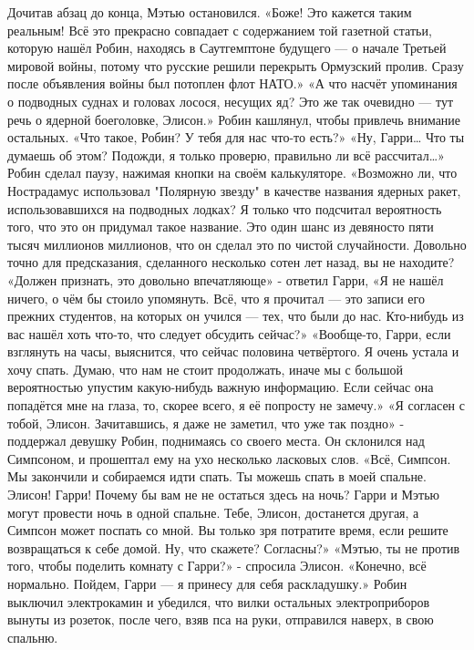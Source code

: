 \documentclass[a4paper,12pt]{book}
\begin{document}
	Дочитав абзац до конца, Мэтью остановился.
	«Боже! Это кажется таким реальным! Всё это прекрасно совпадает с содержанием той газетной статьи, которую нашёл Робин, находясь в Саутгемптоне будущего — о начале Третьей мировой войны, потому что русские решили перекрыть Ормузский пролив. Сразу после объявления войны был потоплен флот НАТО.»
	«А что насчёт упоминания о подводных суднах и головах лосося, несущих яд? Это же так очевидно — тут речь о ядерной боеголовке, Элисон.»
	Робин кашлянул, чтобы привлечь внимание остальных.
	«Что такое, Робин? У тебя для нас что-то есть?»
	«Ну, Гарри… Что ты думаешь об этом? Подожди, я только проверю, правильно ли всё рассчитал…»
	Робин сделал паузу, нажимая кнопки на своём калькуляторе.
	«Возможно ли, что Нострадамус использовал "Полярную звезду" в качестве названия ядерных ракет, использовавшихся на подводных лодках? Я только что подсчитал вероятность того, что это он придумал такое название. Это один шанс из девяносто пяти тысяч миллионов миллионов, что он сделал это по чистой случайности. Довольно точно для предсказания, сделанного несколько сотен лет назад, вы не находите?
	«Должен признать, это довольно впечатляюще» - ответил Гарри,
	«Я не нашёл ничего, о чём бы стоило упомянуть. Всё, что я прочитал — это записи его прежних студентов, на которых он учился — тех, что были до нас. Кто-нибудь из вас нашёл хоть что-то, что следует обсудить сейчас?»
	«Вообще-то, Гарри, если взглянуть на часы, выяснится, что сейчас половина четвёртого. Я очень устала и хочу спать. Думаю, что нам не стоит продолжать, иначе мы с большой вероятностью упустим какую-нибудь важную информацию. Если сейчас она попадётся мне на глаза, то, скорее всего, я её попросту не замечу.»
	«Я согласен с тобой, Элисон. Зачитавшись, я даже не заметил, что уже так поздно» - поддержал девушку Робин, поднимаясь со своего места. Он склонился над Симпсоном, и прошептал ему на ухо несколько ласковых слов.
	«Всё, Симпсон. Мы закончили и собираемся идти спать. Ты можешь спать в моей спальне. Элисон! Гарри! Почему бы вам не не остаться здесь на ночь? Гарри и Мэтью могут провести ночь в одной спальне. Тебе, Элисон, достанется другая, а Симпсон может поспать со мной. Вы только зря потратите время, если решите возвращаться к себе домой. Ну, что скажете? Согласны?»
	«Мэтью, ты не против того, чтобы поделить комнату с Гарри?» - спросила Элисон.
	«Конечно, всё нормально. Пойдем, Гарри — я принесу для себя раскладушку.»
	Робин выключил электрокамин и убедился, что вилки остальных электроприборов вынуты из розеток, после чего, взяв пса на руки, отправился наверх, в свою спальню.
\end{document}
